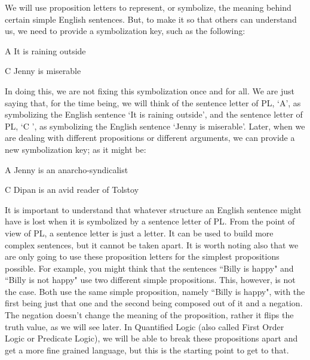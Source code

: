 We will use proposition letters to represent, or symbolize, the meaning behind certain simple English sentences. But, to make it so that others can understand us, we need to provide a \gls{symbolization key}, such as the following:
\begin{ekey}
\item[A] It is raining outside
\item[C] Jenny is miserable
\end{ekey}
In doing this, we are not fixing this symbolization once and for all. We are just saying that, for the time being, we will think of the sentence letter of PL, ‘A’, as symbolizing the English sentence ‘It is raining outside’, and the sentence letter of PL, ‘C ’, as symbolizing the English sentence ‘Jenny is miserable’. Later, when we are dealing with different propositions or different arguments, we can provide a new symbolization key; as it might be:
\begin{earg}
\item[A] Jenny is an anarcho-syndicalist
\item[C] Dipan is an avid reader of Tolstoy
\end{earg}
It is important to understand that whatever structure an English sentence might have is lost when it is symbolized by a sentence letter of PL. From the point of view of PL, a sentence letter is just a letter. It can be used to build more complex sentences, but it cannot be taken apart. It is worth noting also that we are only going to use these proposition letters for the simplest propositions possible. For example, you might think that the sentences “Billy is happy" and “Billy is not happy" use two different simple propositions. This, however, is not the case. Both use the same simple proposition, namely “Billy is happy", with the first being just that one and the second being composed out of it and a negation. The negation doesn't change the meaning of the proposition, rather it flips the truth value, as we will see later. In Quantified Logic (also called First Order Logic or Predicate Logic), we will be able to break these propositions apart and get a more fine grained language, but this is the starting point to get to that.

\chrysippus

